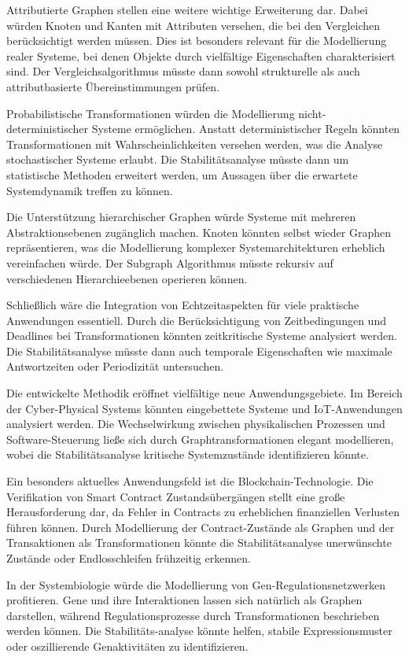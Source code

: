 \documentclass[a4paper,12pt]{article}
\theoremstyle{definition}
\begin{document}
Attributierte Graphen stellen eine weitere wichtige Erweiterung dar. Dabei würden Knoten und Kanten mit Attributen versehen, die bei den Vergleichen berücksichtigt werden müssen. Dies ist besonders relevant für die Modellierung realer Systeme, bei denen Objekte durch vielfältige Eigenschaften charakterisiert sind. Der Vergleichsalgorithmus müsste dann sowohl strukturelle als auch attributbasierte Übereinstimmungen prüfen.

Probabilistische Transformationen würden die Modellierung nicht-deterministischer Systeme ermöglichen. Anstatt deterministischer Regeln könnten Transformationen mit Wahrscheinlichkeiten versehen werden, was die Analyse stochastischer Systeme erlaubt. Die Stabilitätsanalyse müsste dann um statistische Methoden erweitert werden, um Aussagen über die erwartete Systemdynamik treffen zu können.

Die Unterstützung hierarchischer Graphen würde Systeme mit mehreren Abstraktionsebenen zugänglich machen. Knoten könnten selbst wieder Graphen repräsentieren, was die Modellierung komplexer Systemarchitekturen erheblich vereinfachen würde. Der Subgraph Algorithmus müsste rekursiv auf verschiedenen Hierarchieebenen operieren können.

Schließlich wäre die Integration von Echtzeitaspekten für viele praktische Anwendungen essentiell. Durch die Berücksichtigung von Zeitbedingungen und Deadlines bei Transformationen könnten zeitkritische Systeme analysiert werden. Die Stabilitätsanalyse müsste dann auch temporale Eigenschaften wie maximale Antwortzeiten oder Periodizität untersuchen.

Die entwickelte Methodik eröffnet vielfältige neue Anwendungsgebiete. Im Bereich der Cyber-Physical Systems könnten eingebettete Systeme und IoT-Anwendungen analysiert werden. Die Wechselwirkung zwischen physikalischen Prozessen und Software-Steuerung ließe sich durch Graphtransformationen elegant modellieren, wobei die Stabilitätsanalyse kritische Systemzustände identifizieren könnte.

Ein besonders aktuelles Anwendungsfeld ist die Blockchain-Technologie. Die Verifikation von Smart Contract Zustandsübergängen stellt eine große Herausforderung dar, da Fehler in Contracts zu erheblichen finanziellen Verlusten führen können. Durch Modellierung der Contract-Zustände als Graphen und der Transaktionen als Transformationen könnte die Stabilitätsanalyse unerwünschte Zustände oder Endlosschleifen frühzeitig erkennen.

In der Systembiologie würde die Modellierung von Gen-Regulationsnetzwerken profitieren. Gene und ihre Interaktionen lassen sich natürlich als Graphen darstellen, während Regulationsprozesse durch Transformationen beschrieben werden können. Die Stabilitäts-analyse könnte helfen, stabile Expressionsmuster oder oszillierende Genaktivitäten zu identifizieren.
\end{document}
